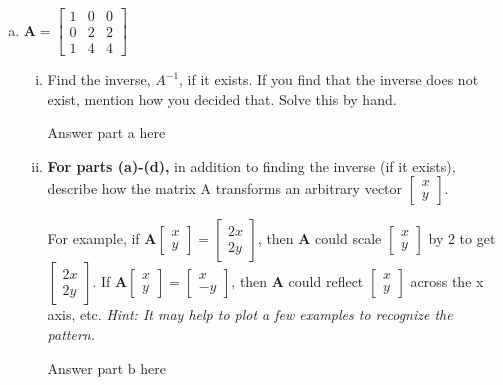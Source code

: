 \documentclass[11pt]{article}
\def\A{\textbf{A}} %
\begin{document}
\begin{enumerate}
\begin{enumerate}[(a)]
	      	\newpage
	      	\item $\A = \begin{bmatrix}
	      	      1 & 0 & 0 \\
	      	      0 & 2 & 2 \\
	      	      1 & 4 & 4
	      	\end{bmatrix}$
	      	\begin{enumerate}[i.]
	      		\item Find the inverse, $A^{-1}$, if it exists. If you find that the inverse does not exist, mention how you decided that. Solve this by hand.
	      		      \begin{Answer}
	      		      	Answer part a here
	      		      \end{Answer}
	      		\item \textbf{For parts (a)-(d),} in addition to finding the inverse (if it exists), describe how the matrix A transforms an arbitrary vector $\begin{bmatrix}
	      		      x \\
	      		      y
	      		\end{bmatrix}$.
	      			      			      		                    
	      		For example, if $\A \begin{bmatrix}
	      		x \\
	      		y
	      		\end{bmatrix} = \begin{bmatrix}
	      		2x \\
	      		2y
	      		\end{bmatrix}$, then $\A$ could scale $\begin{bmatrix}
	      		x \\
	      		y
	      		\end{bmatrix}$ by 2 to get $\begin{bmatrix}
	      		2x \\
	      		2y
	      		\end{bmatrix}$. If $\A \begin{bmatrix}
	      		x \\
	      		y
	      		\end{bmatrix}
	      		=
	      		\begin{bmatrix}
	      			x  \\
	      			-y 
	      		\end{bmatrix}$, then $\A$ could reflect $\begin{bmatrix}
	      		x \\
	      		y
	      		\end{bmatrix}$ across the x axis, etc. \textit{Hint: It may help to plot a few examples to recognize the pattern.}
	      		\begin{Answer}
	      			Answer part b here
	      		\end{Answer}
	      	\end{enumerate}
	      \end{enumerate}
	      	      	      

\end{enumerate}
\end{document}
